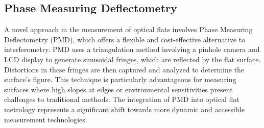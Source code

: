 \documentclass[../main.tex]{subfiles}
\begin{document}
\subsection{Phase Measuring Deflectometry}
A novel approach in the measurement of optical flats involves Phase Measuring Deflectometry (PMD), which offers a flexible and cost-effective alternative to interferometry. PMD uses a triangulation method involving a pinhole camera and LCD display to generate sinusoidal fringes, which are reflected by the flat surface. Distortions in these fringes are then captured and analyzed to determine the surface's figure. This technique is particularly advantageous for measuring surfaces where high slopes at edges or environmental sensitivities present challenges to traditional methods. The integration of PMD into optical flat metrology represents a significant shift towards more dynamic and accessible measurement technologies.\cite{WOS:000385319500019}
\end{document}
